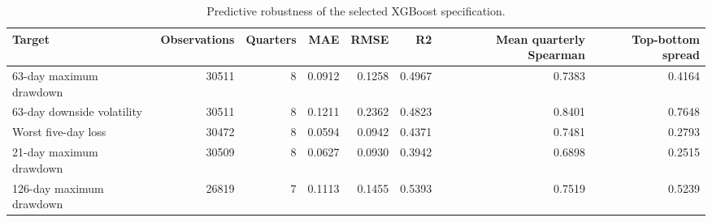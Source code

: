 \begin{table}
\caption{Predictive robustness of the selected XGBoost specification.}
\label{tab:xgboost-prediction-robustness}
\begin{tabular}{lrrrrrrr}
\toprule
Target & Observations & Quarters & MAE & RMSE & R2 & Mean quarterly Spearman & Top-bottom spread \\
\midrule
63-day maximum drawdown & 30511 & 8 & 0.0912 & 0.1258 & 0.4967 & 0.7383 & 0.4164 \\
63-day downside volatility & 30511 & 8 & 0.1211 & 0.2362 & 0.4823 & 0.8401 & 0.7648 \\
Worst five-day loss & 30472 & 8 & 0.0594 & 0.0942 & 0.4371 & 0.7481 & 0.2793 \\
21-day maximum drawdown & 30509 & 8 & 0.0627 & 0.0930 & 0.3942 & 0.6898 & 0.2515 \\
126-day maximum drawdown & 26819 & 7 & 0.1113 & 0.1455 & 0.5393 & 0.7519 & 0.5239 \\
\bottomrule
\end{tabular}
\end{table}

